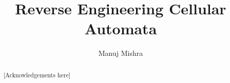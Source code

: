\documentclass[a4paper, twoside]{report}
\title{Reverse Engineering Cellular Automata}
\author{Manuj Mishra}
\begin{document}


\begin{abstract}

\end{abstract}

\renewcommand{\abstractname}{Acknowledgements}
\renewcommand{\listtheoremname}{List of Definitions}
\begin{abstract}
[Acknowledgements here]
\end{abstract}

\tableofcontents
\listoffigures
\listoftheorems[ignoreall,show={definition}]
\begingroup
\let\clearpage\relax
\listofalgorithms
\endgroup













\end{document}
